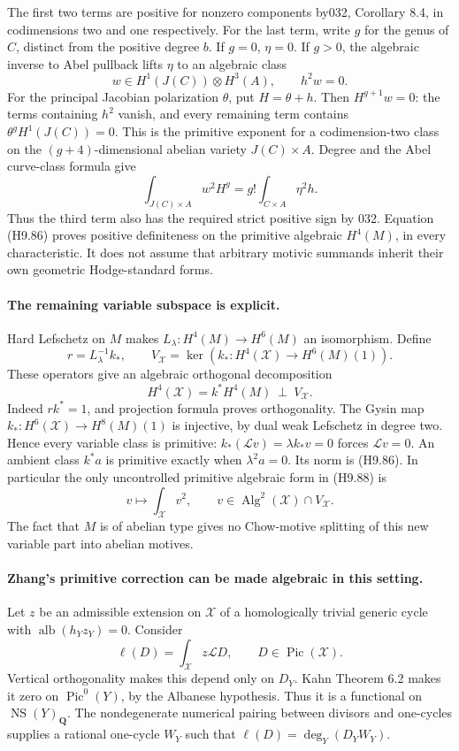 \documentclass[11pt,a4paper]{article}
\begin{document}
The first two terms are positive for nonzero components by032,
Corollary 8.4, in codimensions two and one respectively. For the
last term, write $g$ for the genus of $C$, distinct from the
positive degree $b$. If $g=0$, $\eta=0$. If $g>0$, the algebraic
inverse to Abel pullback lifts $\eta$ to an algebraic class
\[
 w\in H^1(J(C))\otimes H^3(A),\qquad h^2w=0.
\]
For the principal Jacobian polarization $\theta$, put $H=\theta+h$.
Then $H^{g+1}w=0$: the terms containing $h^2$ vanish, and every
remaining term contains $\theta^gH^1(J(C))=0$. This is the
primitive exponent for a codimension-two class on the
$(g+4)$-dimensional abelian variety $J(C)\times A$. Degree and
the Abel curve-class formula give
\[
 \int_{J(C)\times A}w^2H^g
       =g!\int_{C\times A}\eta^2h.                        \tag{H9.87}
\]
Thus the third term also has the required strict positive sign by
032. Equation (H9.86) proves positive definiteness on the
primitive algebraic $H^4(M)$, in every characteristic. It does
not assume that arbitrary motivic summands inherit their own
geometric Hodge-standard forms.

\paragraph{The remaining variable subspace is explicit.}
Hard Lefschetz on $M$ makes
$L_\lambda:H^4(M)\to H^6(M)$ an isomorphism. Define
\[
 r=L_\lambda^{-1}k_*,\qquad
 V_{\mathcal X}=\ker(k_*:H^4(\mathcal X)\to H^6(M)(1)).
\]
These operators give an algebraic orthogonal decomposition
\[
 H^4(\mathcal X)=k^*H^4(M)\ \mathbin\perp\ V_{\mathcal X}.
                                                               \tag{H9.88}
\]
Indeed $rk^*=1$, and projection formula proves orthogonality.
The Gysin map $k_*:H^6(\mathcal X)\to H^8(M)(1)$ is injective,
by dual weak Lefschetz in degree two. Hence every variable class
is primitive: $k_*(\mathcal L v)=\lambda k_*v=0$ forces
$\mathcal L v=0$. An ambient class $k^*a$ is primitive exactly
when $\lambda^2a=0$. Its norm is (H9.86). In particular the only
uncontrolled primitive algebraic form in (H9.88) is
\[
        v\longmapsto\int_{\mathcal X}v^2,
            \qquad v\in\operatorname{Alg}^2(\mathcal X)
                                  \cap V_{\mathcal X}.      \tag{H9.89}
\]
The fact that $M$ is of abelian type gives no Chow-motive splitting
of this new variable part into abelian motives.

\paragraph{Zhang's primitive correction can be made algebraic in this setting.}
Let $z$ be an admissible extension on $\mathcal X$ of a
homologically trivial generic cycle with
$\operatorname{alb}(h_Yz_Y)=0$. Consider
\[
         \ell(D)=\int_{\mathcal X}z\mathcal L D,
                                      \qquad D\in\operatorname{Pic}(\mathcal X).
\]
Vertical orthogonality makes this depend only on $D_Y$.
Kahn Theorem 6.2 makes it zero on $\operatorname{Pic}^0(Y)$,
by the Albanese hypothesis. Thus it is a functional on
$\operatorname{NS}(Y)_{\mathbf Q}$. The nondegenerate numerical
pairing between divisors and one-cycles supplies a rational
one-cycle $W_Y$ such that
$\ell(D)=\deg_Y(D_YW_Y)$.
\end{document}
